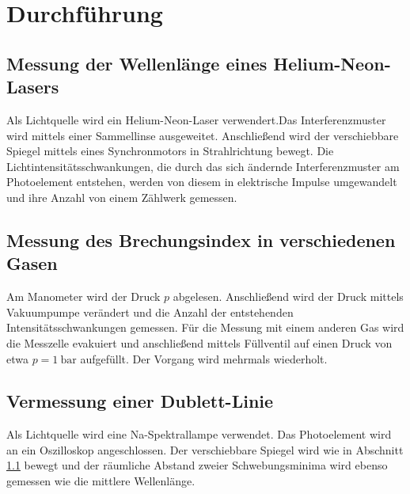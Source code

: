 \section{Durchführung}
\label{sec:Durchführung}

\subsection{Messung der Wellenlänge eines Helium-Neon-Lasers}
\label{sec:WL}
Als Lichtquelle wird ein Helium-Neon-Laser verwendert.Das Interferenzmuster wird mittels einer Sammellinse ausgeweitet. Anschließend wird der verschiebbare Spiegel mittels eines Synchronmotors in Strahlrichtung bewegt. Die Lichtintensitätsschwankungen, die durch das sich ändernde Interferenzmuster am Photoelement entstehen, werden von diesem in elektrische Impulse umgewandelt und ihre Anzahl von einem Zählwerk gemessen.
\subsection{Messung des Brechungsindex in verschiedenen Gasen}
Am Manometer wird der Druck $p$ abgelesen. Anschließend wird der Druck mittels Vakuumpumpe verändert und die Anzahl der entstehenden Intensitätsschwankungen gemessen.
Für die Messung mit einem anderen Gas wird die Messzelle evakuiert und anschließend mittels Füllventil auf einen Druck von etwa $p=\SI{1}{\bar}$ aufgefüllt. Der Vorgang wird mehrmals wiederholt.
\subsection{Vermessung einer Dublett-Linie}
Als Lichtquelle wird eine Na-Spektrallampe verwendet. Das Photoelement wird an ein Oszilloskop angeschlossen. Der verschiebbare Spiegel wird wie in Abschnitt \ref{sec:WL} bewegt und der räumliche Abstand zweier Schwebungsminima wird ebenso gemessen wie die mittlere Wellenlänge.
